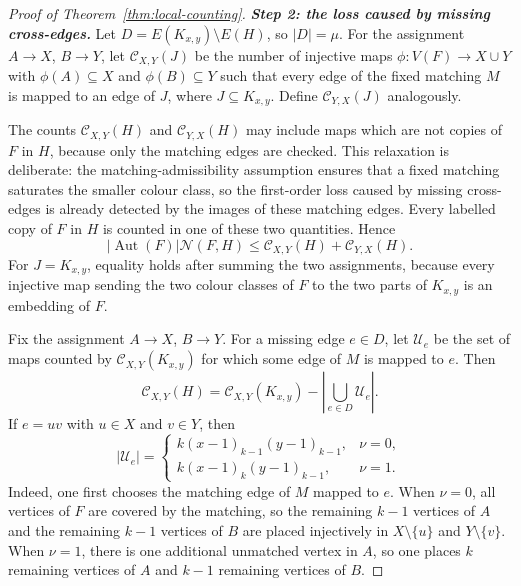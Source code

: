 \documentclass[11pt]{article}
\theoremstyle{definition}
\theoremstyle{plain}
\theoremstyle{remark}
\theoremstyle{plain}
\numberwithin{equation}{section}
\DeclareMathOperator{\Aut}{Aut}
\newcommand{\N}{\mathcal N}
\begin{document}
\begin{proof}[Proof of Theorem~\ref{thm:local-counting}]
\medskip
\noindent\emph{\textbf{Step 2: the loss caused by missing cross-edges.}}
Let $D=E(K_{x,y})\setminus E(H)$, so $|D|=\mu$. For the assignment $A\to X$, $B\to Y$, let $\mathcal C_{X,Y}(J)$ be the number of injective maps $\phi:V(F)\to X\cup Y$ with $\phi(A)\subseteq X$ and $\phi(B)\subseteq Y$ such that every edge of the fixed matching $M$ is mapped to an edge of $J$, where $J\subseteq K_{x,y}$. Define $\mathcal C_{Y,X}(J)$ analogously.

The counts $\mathcal C_{X,Y}(H)$ and $\mathcal C_{Y,X}(H)$ may include maps which are not copies of $F$ in $H$, because only the matching edges are checked. This relaxation is deliberate: the matching-admissibility assumption ensures that a fixed matching saturates the smaller colour class, so the first-order loss caused by missing cross-edges is already detected by the images of these matching edges. Every labelled copy of $F$ in $H$ is counted in one of these two quantities. Hence
\begin{equation}\label{eq:C-upper-N}
        |\Aut(F)|\N(F,H)
        \le \mathcal C_{X,Y}(H)+\mathcal C_{Y,X}(H).
\end{equation}
For $J=K_{x,y}$, equality holds after summing the two assignments, because every injective map sending the two colour classes of $F$ to the two parts of $K_{x,y}$ is an embedding of $F$.

Fix the assignment $A\to X$, $B\to Y$. For a missing edge $e\in D$, let $\mathcal U_e$ be the set of maps counted by $\mathcal C_{X,Y}(K_{x,y})$ for which some edge of $M$ is mapped to $e$. Then
\[
        \mathcal C_{X,Y}(H)
        =\mathcal C_{X,Y}(K_{x,y})-
        \left|\bigcup_{e\in D}\mathcal U_e\right|.
\]
If $e=uv$ with $u\in X$ and $v\in Y$, then
\[
        |\mathcal U_e|=
        \begin{cases}
        k(x-1)_{k-1}(y-1)_{k-1}, & \nu=0,\\[0.8ex]
        k(x-1)_k(y-1)_{k-1}, & \nu=1.
        \end{cases}
\]
Indeed, one first chooses the matching edge of $M$ mapped to $e$. When $\nu=0$, all vertices of $F$ are covered by the matching, so the remaining $k-1$ vertices of $A$ and the remaining $k-1$ vertices of $B$ are placed injectively in $X\setminus\{u\}$ and $Y\setminus\{v\}$. When $\nu=1$, there is one additional unmatched vertex in $A$, so one places $k$ remaining vertices of $A$ and $k-1$ remaining vertices of $B$.


\end{proof}
\end{document}
